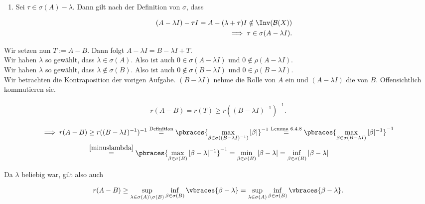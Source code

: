 \begin{solution}
\begin{enumerate}[label = (\alph*)]
\begin{enumerate}[label = \arabic*.]
    \item
    Sei $\tau \in \sigma(A) - \lambda$. Dann gilt nach der Definition von $\sigma$, dass

    \begin{align*}
      (A - \lambda I) - \tau I
      =
      A - (\lambda + \tau) I
      \notin
      \Inv(\mathcal{B}(X)) \\
      \implies
      \tau \in \sigma(A - \lambda I).
    \end{align*}

  \end{enumerate}

  Wir setzen nun $T := A - B$. Dann folgt $A- \lambda I = B - \lambda I + T$. \\

  Wir haben $\lambda$ so gewählt, dass $\lambda \in \sigma(A)$.
  Also ist auch $0 \in \sigma(A - \lambda I)$ und $0 \notin \rho(A - \lambda I)$. \\
  Wir haben $\lambda$ so gewählt, dass $\lambda \notin \sigma(B)$.
  Also ist auch $0 \notin \sigma(B - \lambda I)$ und $0 \in \rho(B - \lambda I)$. \\

  Wir betrachten die Kontraposition der vorigen Aufgabe.
  $(B - \lambda I)$ nehme die Rolle von $A$ ein und $(A - \lambda I)$ die von $B$.
  Offensichtlich kommutieren sie.

  \begin{align*}
    r(A - B)
    =
    r(T)
    \geq
    r((B-\lambda I)^{-1})^{-1}.
  \end{align*}


  \begin{align*}
    \implies
    r(A - B)
    & \geq
    r((B - \lambda I)^{-1})^{-1}
    \stackrel{\text{Definition}}{=}
    \pbraces
    {
      \max_{\beta \in \sigma((B - \lambda I)^{-1})} |\beta|
    }^{-1}
    \stackrel{\text{Lemma 6.4.8}}{=}
    \pbraces
    {
      \max_{\beta \in \sigma(B - \lambda I)} |\beta|^{-1}
    }^{-1} \\
    & \stackrel{\eqref{minuslambda}}{=}
    \pbraces
    {
      \max_{\beta \in \sigma(B)}
      |\beta - \lambda|^{-1}
    }^{-1}
    =
    \min_{\beta \in \sigma(B)}
    |\beta - \lambda|
    =
    \inf_{\beta \in \sigma(B)}
    |\beta - \lambda|
  \end{align*}

  Da $\lambda$ beliebig war, gilt also auch

  \begin{align*}
    r(A - B)
    \geq
    \sup_{\lambda \in \sigma(A) \setminus \sigma(B)}
    \inf_{\beta \in \sigma(B)} \vbraces{\beta - \lambda}
    =
    \sup_{\lambda \in \sigma(A)}
    \inf_{\beta \in \sigma(B)}
    \vbraces{\beta - \lambda}.
  \end{align*}


\end{enumerate}
\end{solution}
